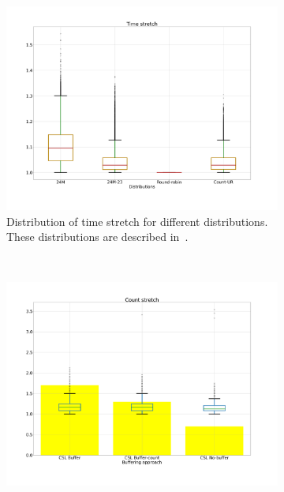 \begin{figure}
{\centering
\begin{subfigure}{.50\textwidth}
  \centering
  \includegraphics[width=\linewidth]{../LERT-src/sigmod20_figs/timestretch-arb-dist.png}
  \captionsetup{margin=.5cm}
  \caption{Distribution of time stretch for different
    distributions. These distributions are described in~.}
  \label{fig:timestretch-arb}
\end{subfigure}
\\
\begin{subfigure}{.50\textwidth}
  \centering
  \includegraphics[width=\linewidth]{../LERT-src/sigmod20_figs/countstretch-buffer-dist.png}

\end{subfigure}}
\end{figure}
